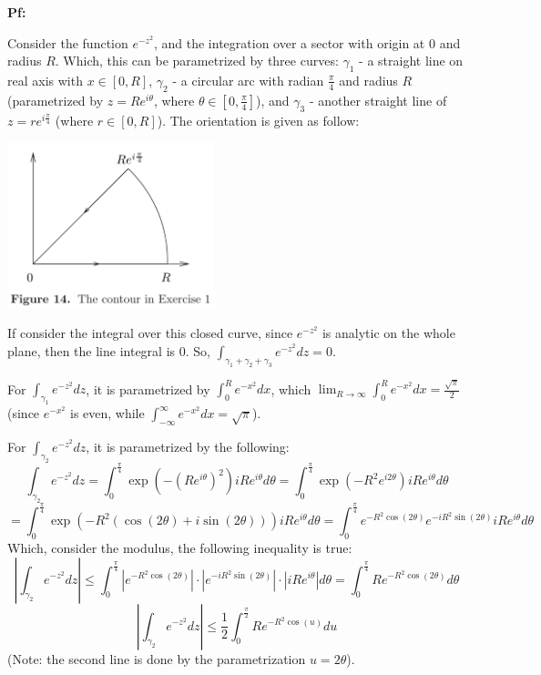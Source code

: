\documentclass{article}
\begin{document}
\textbf{Pf:}

Consider the function $e^{-z^2}$, and the integration over a sector with origin at $0$ and radius $R$.
Which, this can be parametrized by three curves: $\gamma_1$ - a straight line on real axis with $x\in[0,R]$, 
$\gamma_2$ - a circular arc with radian $\frac{\pi}{4}$ and radius $R$ (parametrized by $z=Re^{i\theta}$, where $\theta\in [0,\frac{\pi}{4}]$),
and $\gamma_3$ - another straight line of $z=re^{i\frac{\pi}{4}}$ (where $r\in [0,R]$). The orientation is given as follow:

\begin{center}
    \includegraphics*[width=60mm]{problem 3.png}
\end{center}

If consider the integral over this closed curve, since $e^{-z^2}$ is analytic on the whole plane, then the line integral is $0$. So, $\int_{\gamma_1+\gamma_2+\gamma_3}e^{-z^2}dz=0$.

\hfil

For $\int_{\gamma_1}e^{-z^2}dz$, it is parametrized by $\int_{0}^{R}e^{-x^2}dx$, which $\lim_{R\rightarrow\infty}\int_{0}^{R}e^{-x^2}dx=\frac{\sqrt{\pi}}{2}$ (since $e^{-x^2}$ is even, while $\int_{-\infty}^{\infty}e^{-x^2}dx=\sqrt{\pi}$).

\hfil

For $\int_{\gamma_2}e^{-z^2}dz$, it is parametrized by the following:
$$\int_{\gamma_2}e^{-z^2}dz=\int_{0}^{\frac{\pi}{4}}\exp\left(-(Re^{i\theta})^2\right)iRe^{i\theta}d\theta = \int_{0}^{\frac{\pi}{4}}\exp(-R^2e^{i2\theta})iRe^{i\theta}d\theta$$
$$= \int_{0}^{\frac{\pi}{4}}\exp(-R^2(\cos(2\theta)+i\sin(2\theta)))iRe^{i\theta}d\theta = \int_{0}^{\frac{\pi}{4}}e^{-R^2\cos(2\theta)}e^{-iR^2\sin(2\theta)}iRe^{i\theta}d\theta$$
Which, consider the modulus, the following inequality is true:
$$\left|\int_{\gamma_2}e^{-z^2}dz\right|\leq \int_{0}^{\frac{\pi}{4}}|e^{-R^2\cos(2\theta)}|\cdot |e^{-iR^2\sin(2\theta)}|\cdot |iRe^{i\theta}|d\theta = \int_{0}^{\frac{\pi}{4}}Re^{-R^2\cos(2\theta)}d\theta$$
$$\left|\int_{\gamma_2}e^{-z^2}dz\right|\leq \frac{1}{2}\int_{0}^{\frac{\pi}{2}}Re^{-R^2\cos(u)}du$$
(Note: the second line is done by the parametrization $u=2\theta$).
\end{document}
